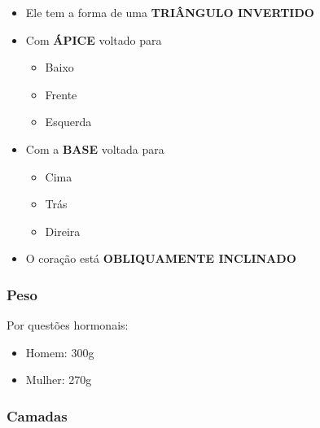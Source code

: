 \documentclass[
]{book}
\providecommand{\tightlist}{%
  \setlength{\itemsep}{0pt}\setlength{\parskip}{0pt}}
\begin{document}
\begin{itemize}
\tightlist
\item
  Ele tem a forma de uma \textbf{TRIÂNGULO INVERTIDO}
\item
  Com \textbf{ÁPICE} voltado para

  \begin{itemize}
  \tightlist
  \item
    Baixo
  \item
    Frente
  \item
    Esquerda
  \end{itemize}
\item
  Com a \textbf{BASE} voltada para

  \begin{itemize}
  \tightlist
  \item
    Cima
  \item
    Trás
  \item
    Direira
  \end{itemize}
\item
  O coração está \textbf{OBLIQUAMENTE INCLINADO}
\end{itemize}

\hypertarget{peso}{%
\subsubsection{Peso}\label{peso}}

Por questões hormonais:

\begin{itemize}
\tightlist
\item
  Homem: 300g
\item
  Mulher: 270g
\end{itemize}

\hypertarget{camadas}{%
\subsubsection{Camadas}\label{camadas}}
\end{document}
